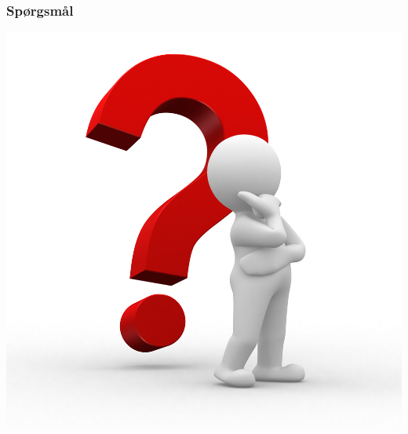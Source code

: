 \documentclass{beamer}
\begin{document}
\begin{frame}
	\frametitle{Spørgsmål}
\begin{center}
		\includegraphics[width=0.7\linewidth]{images/q.jpg}
	\end{center}
\end{frame}
\end{document}
